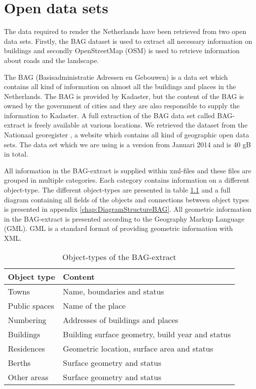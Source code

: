 \chapter{Open data sets}
\label{chap:OpenDataSets}
The data required to render the Netherlands have been retrieved from two open data sets. Firstly, the BAG dataset \cite{BAG14} is used to extract all necessary information on buildings and secondly OpenStreetMap (OSM) \cite{OSM14} is used to retrieve information about roads and the landscape.

The BAG (Basisadministratie Adressen en Gebouwen) is a data set which contains all kind of information on almost all the buildings and places in the Netherlands. The BAG is provided by Kadaster, but the content of the BAG is owned by the government of cities and they are also responsible to supply the information to Kadaster. A full extraction of the BAG data set called BAG-extract is freely available at various locations. We retrieved the dataset from the Nationaal georegister \cite{NG14}, a website which contains all kind of geographic open data sets. The data set which we are using is a version from Januari 2014 and is 40 gB in total.

All information in the BAG-extract is supplied within xml-files and these files are grouped in multiple categories. Each category contains information on a different object-type. The different object-types are presented in table \ref{Table:ObjectTypesBAG} and a full diagram containing all fields of the objects and connections between object types is presented in appendix \ref{chap:DiagramStructureBAG}. All geometric information in the BAG-extract is presented according to the Geography Markup Language (GML). GML is a standard format of providing geometric information with XML.

\begin{table}
  \centering
  \begin{tabular}{l l}
    \textbf{Object type} & \textbf{Content}     \\ \hline
    Towns & Name, boundaries and status  \\ \hline
    Public spaces & Name of the place  \\ \hline
    Numbering & Addresses of buildings and places  \\ \hline
    Buildings & Building surface geometry, build year and status  \\ \hline
    Residences & Geometric location, surface area and status  \\ \hline
    Berths & Surface geometry and status  \\ \hline
    Other areas & Surface geometry and status \\
  \end{tabular}
  \caption{Object-types of the BAG-extract}
  \label{Table:ObjectTypesBAG}
\end{table}

